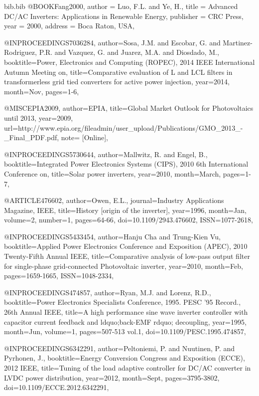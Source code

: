 \begin{filecontents}{bib.bib}
@BOOK{Fang2000,
author = {Luo, F.L. and Ye, H.},
title = {Advanced DC/AC Inverters: Applications in Renewable Energy},
publisher = {CRC Press},
year = {2000},
address = {Boca Raton, USA},}

@INPROCEEDINGS{7036284, 
author={Sosa, J.M. and Escobar, G. and Martinez-Rodriguez, P.R. and Vazquez, G. and Juarez, M.A. and Diosdado, M.}, 
booktitle={Power, Electronics and Computing (ROPEC), 2014 IEEE International Autumn Meeting on}, 
title={Comparative evaluation of L and LCL filters in transformerless grid tied converters for active power injection}, 
year={2014}, 
month={Nov}, 
pages={1-6},}

@MISC{EPIA2009,
author={EPIA},
title={Global Market Outlook for Photovoltaics until 2013},
year={2009},
url={http://www.epia.org/fileadmin/user_upload/Publications/GMO_2013_-_Final_PDF.pdf},
note= {[Online]},}

@INPROCEEDINGS{5730644, 
author={Mallwitz, R. and Engel, B.}, 
booktitle={Integrated Power Electronics Systems (CIPS), 2010 6th International Conference on}, 
title={Solar power inverters}, 
year={2010}, 
month={March}, 
pages={1-7},}

@ARTICLE{476602, 
author={Owen, E.L.}, 
journal={Industry Applications Magazine, IEEE}, 
title={History [origin of the inverter]}, 
year={1996}, 
month={Jan}, 
volume={2}, 
number={1}, 
pages={64-66}, 
doi={10.1109/2943.476602}, 
ISSN={1077-2618},}

@INPROCEEDINGS{5433454, 
author={Hanju Cha and Trung-Kien Vu}, 
booktitle={Applied Power Electronics Conference and Exposition (APEC), 2010 Twenty-Fifth Annual IEEE}, 
title={Comparative analysis of low-pass output filter for single-phase grid-connected Photovoltaic inverter}, 
year={2010}, 
month={Feb}, 
pages={1659-1665}, 
ISSN={1048-2334},}

@INPROCEEDINGS{474857, 
author={Ryan, M.J. and Lorenz, R.D.}, 
booktitle={Power Electronics Specialists Conference, 1995. PESC '95 Record., 26th Annual IEEE}, 
title={A high performance sine wave inverter controller with capacitor current feedback and ldquo;back-EMF rdquo; decoupling}, 
year={1995}, 
month={Jun}, 
volume={1}, 
pages={507-513 vol.1}, 
doi={10.1109/PESC.1995.474857},}

@INPROCEEDINGS{6342291, 
author={Peltoniemi, P. and Nuutinen, P. and Pyrhonen, J.}, 
booktitle={Energy Conversion Congress and Exposition (ECCE), 2012 IEEE}, 
title={Tuning of the load adaptive controller for DC/AC converter in LVDC power distribution}, 
year={2012}, 
month={Sept}, 
pages={3795-3802}, 
doi={10.1109/ECCE.2012.6342291},}


\end{filecontents}
